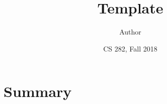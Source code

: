 \documentclass[11pt,letterpaper]{article}
\title{Template}
\author{Author}
\date{CS 282, Fall 2018}
\begin{document}
\maketitle

\section{Summary}




% 
% 
\end{document}
